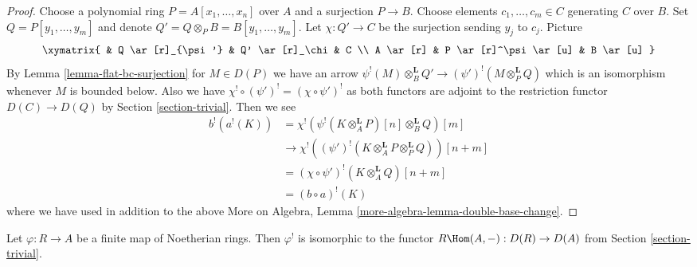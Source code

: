 \begin{proof}
Choose a polynomial ring $P = A[x_1, \ldots, x_n]$ over $A$
and a surjection $P \to B$. Choose elements $c_1, \ldots, c_m \in C$
generating $C$ over $B$. Set $Q = P[y_1, \ldots, y_m]$ and
denote $Q' = Q \otimes_P B = B[y_1, \ldots, y_m]$.
Let $\chi : Q' \to C$ be the surjection sending $y_j$ to $c_j$.
Picture
$$
\xymatrix{
& Q \ar[r]_{\psi'} & Q' \ar[r]_\chi & C \\
A \ar[r] & P \ar[r]^\psi \ar[u] & B \ar[u]
}
$$
By Lemma \ref{lemma-flat-bc-surjection} for $M \in D(P)$ we have an arrow
$\psi^!(M) \otimes_B^\mathbf{L} Q' \to (\psi')^!(M \otimes_P^\mathbf{L} Q)$
which is an isomorphism whenever $M$ is bounded below. Also
we have $\chi^! \circ (\psi')^! = (\chi \circ \psi')^!$ as both
functors are adjoint to the restriction functor $D(C) \to D(Q)$
by Section \ref{section-trivial}. Then we see
\begin{align*}
b^!(a^!(K))
& =
\chi^!(\psi^!(K \otimes_A^\mathbf{L} P)[n] \otimes_B^\mathbf{L} Q)[m] \\
& \to
\chi^!((\psi')^!(K \otimes_A^\mathbf{L} P \otimes_P^\mathbf{L} Q))[n + m] \\
& =
(\chi \circ \psi')^!(K\otimes_A^\mathbf{L} Q)[n + m] \\
& =
(b \circ a)^!(K)
\end{align*}
where we have used in addition to the above
More on Algebra, Lemma \ref{more-algebra-lemma-double-base-change}.
\end{proof}

\begin{lemma}
\label{lemma-upper-shriek-finite}
Let $\varphi : R \to A$ be a finite map of Noetherian rings.
Then $\varphi^!$ is isomorphic to the functor
$R\Hom(A, -) : D(R) \to D(A)$ from Section \ref{section-trivial}.
\end{lemma}

